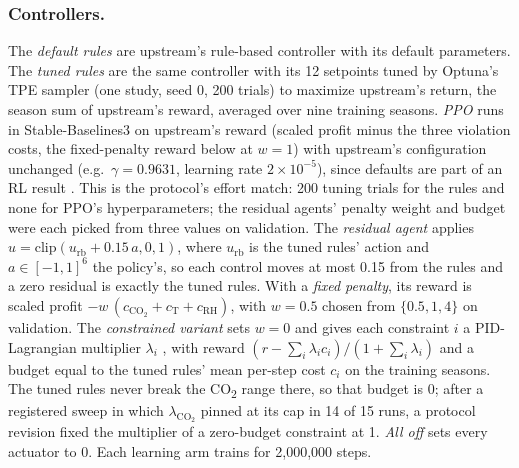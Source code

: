 \documentclass[letterpaper]{article} %
\newcommand{\cotwo}{CO\textsubscript{2}}
\begin{document}
\subsubsection{Controllers.}
The \emph{default rules} are upstream's rule-based controller with its default parameters. The \emph{tuned rules} are the same controller with its 12 setpoints tuned by Optuna's TPE sampler \cite{akiba2019optuna,bergstra2011tpe} (one study, seed 0, 200 trials) to maximize upstream's return, the season sum of upstream's reward, averaged over nine training seasons. \emph{PPO} \cite{schulman2017ppo} runs in Stable-Baselines3 \cite{raffin2021sb3} on upstream's reward (scaled profit minus the three violation costs, the fixed-penalty reward below at $w = 1$) with upstream's configuration unchanged (e.g.\ $\gamma = 0.9631$, learning rate $2 \times 10^{-5}$), since defaults are part of an RL result \cite{engstrom2020implementation}. This is the protocol's effort match: 200 tuning trials for the rules and none for PPO's hyperparameters; the residual agents' penalty weight and budget were each picked from three values on validation.
The \emph{residual agent} applies $u = \mathrm{clip}(u_{\mathrm{rb}} + 0.15\,a, 0, 1)$, where $u_{\mathrm{rb}}$ is the tuned rules' action and $a \in [-1, 1]^6$ the policy's, so each control moves at most 0.15 from the rules and a zero residual is exactly the tuned rules. With a \emph{fixed penalty}, its reward is scaled profit $- w\,(c_{\mathrm{CO_2}} + c_{\mathrm{T}} + c_{\mathrm{RH}})$, with $w = 0.5$ chosen from $\{0.5, 1, 4\}$ on validation.
The \emph{constrained variant} sets $w = 0$ and gives each constraint $i$ a PID-Lagrangian multiplier $\lambda_i$ \cite{stooke2020pid}, with reward $(r - \sum_i \lambda_i c_i)/(1 + \sum_i \lambda_i)$ and a budget equal to the tuned rules' mean per-step cost $c_i$ on the training seasons. The tuned rules never break the \cotwo{} range there, so that budget is 0; after a registered sweep in which $\lambda_{\mathrm{CO_2}}$ pinned at its cap in 14 of 15 runs, a protocol revision fixed the multiplier of a zero-budget constraint at 1. \emph{All off} sets every actuator to 0. Each learning arm trains for 2,000,000 steps.
\end{document}
